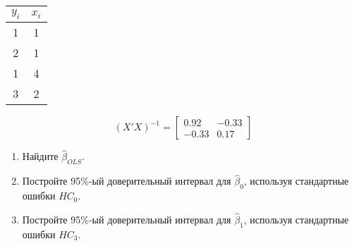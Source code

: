 \documentclass[10pt, a4paper]{extarticle}
\begin{document}
	\begin{center}
	\begin{tabular}{c|c}
		$y_i$ & $x_i$ \\
		\hline
		1 & 1 \\
		2 & 1 \\
		1 & 4 \\
		3 & 2
	\end{tabular}
	\end{center}

	\[
	(X'X)^{-1} = \begin{bmatrix}
		0.92 & -0.33 \\
		-0.33 & 0.17
	\end{bmatrix}
	\]

	\begin{enumerate}[label = \alph*)]
		\item Найдите $\hat{\beta}_{OLS}$.		
		\item Постройте 95\%-ый доверительный интервал для $\hat{\beta}_0$, используя стандартные ошибки $HC_0$.
		\item Постройте 95\%-ый доверительный интервал для $\hat{\beta}_1$, используя стандартные ошибки $HC_3$.
	\end{enumerate}
	
\end{document}
